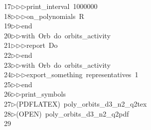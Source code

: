 \begin{tabbing}
17\>$\triangleright$\>$\triangleright$\>$\triangleright$\>print\_interval\ 1000000\ \\[0pt]
18\>$\triangleright$\>$\triangleright$\>$\triangleright$\>on\_polynomials\ R\ \\[0pt]
19\>$\triangleright$\>$\triangleright$\>end\ \\[0pt]
20\>$\triangleright$\>$\triangleright$\>with\ Orb\ do\ orbits\_activity\ \\[0pt]
21\>$\triangleright$\>$\triangleright$\>$\triangleright$\>report\ Do\ \\[0pt]
22\>$\triangleright$\>$\triangleright$\>end\ \\[0pt]
23\>$\triangleright$\>$\triangleright$\>with\ Orb\ do\ orbits\_activity\ \\[0pt]
24\>$\triangleright$\>$\triangleright$\>$\triangleright$\>export\_something\ representatives\ 1\ \\[0pt]
25\>$\triangleright$\>$\triangleright$\>end\\[0pt]
26\>$\triangleright$\>$\triangleright$\>print\_symbols\\[0pt]
27\>$\triangleright$\>(PDFLATEX)\ poly\_orbits\_d3\_n2\_q2tex\\[0pt]
28\>$\triangleright$\>(OPEN)\ poly\_orbits\_d3\_n2\_q2pdf\\[0pt]
29\>\end{tabbing}
